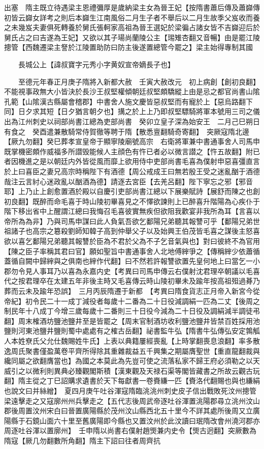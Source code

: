 出塞　隋主既立待遇梁主恩禮彌厚是歲納梁主女為晉王妃【按隋書蕭后傳及蕭巋傳初皆云巋女詳考之則后本巋生江南風俗二月生子者不舉后以二月生故季父岌收而養之未幾岌夫妻俱死轉養於舅氏張軻家高祖為晉王選妃於梁徧占諸女皆不吉巋迎后於舅氏占之曰吉遂為王妃】又欲以其子瑒尚蘭陵公主【㻛雉杏翻又音暢】由是罷江陵摠管【西魏遷梁主詧於江陵置助防曰防主後遂置總管今罷之】梁主始得專制其國

　　長城公上【諱叔寶字元秀小字黄奴宣帝嫡長子也】

　　至德元年春正月庚子隋將入新都大赦　壬寅大赦改元　初上病創【創初良翻】不能視事政無大小皆決於長沙王叔堅權傾朝廷叔堅頗驕縱上由是忌之都官尚書山隂孔範【山隂漢古縣屬會稽郡】中書舍人施文慶皆惡叔堅而有寵於上【惡烏路翻下同】日夕求其短【日夕猶言朝夕也】搆之於上上乃即叔堅驃騎將軍本號用三司之儀出為江州刺史以祠部尚書江總為吏部尚書　癸卯立皇子深為始安王　二月己巳朔日有食之　癸酉遣兼散騎常侍賀徹等聘于隋【散悉亶翻騎奇寄翻】　突厥寇隋北邊【厥九勿翻】癸巳葬孝宣皇帝于顯寧陵廟號高宗　右衛將軍兼中書通事舍人司馬申既掌機密頗作威福多所譛毁能候人主顔色有忤已者必以微言譛之【忤五故翻】附已者因機進之是以朝廷内外皆從風而靡上欲用侍中吏部尚書毛喜為僕射申惡喜彊直言於上曰喜臣之妻兄高宗時稱陛下有酒德【周公戒成王曰無若殷王受之迷亂酗于酒德哉注云言紂心迷政亂以酗酒為德】請逐去宮臣【去羌呂翻】陛下寧忘之邪【邪音耶】上乃止上創愈置酒於殿以自慶引吏部尚書江總以下展樂賦詩【展舒而陳之也創初良翻】既醉而命毛喜于時山陵初畢喜見之不懌欲諫則上已醉喜升階陽為心疾仆于階下移出省中上醒謂江總曰我悔召毛喜彼實無疾但欲阻我歡宴非我所為耳【言喜以帝所為為非】乃與司馬申謀曰此人負氣吾欲乞鄱陽兄弟聽其報讐可乎【鄱陽兄弟世祖諸子也高宗之簒殺劉師知韓子高到仲舉父子以及始興王伯茂皆毛喜之謀後主怒喜欲以喜乞鄱陽兄弟聽其報讐於臣為不君於父為不子乞音氣與也】對曰彼終不為官用【陳之臣子率稱其君曰官】願如聖旨中書通事舍人北地傅縡爭之【傳稱縡少依蕭循蓋循自闕中歸縡與之俱南也縡作代翻】曰不然若許報讐欲置先皇何地上曰當乞一小郡勿令見人事耳乃以喜為永嘉内史【考異曰司馬申傳云右僕射沈君理卒朝議以毛喜代之按君理卒在太建五年非後主時又毛喜傳云時山陵初畢未及踰年按高祖殂過朞乃葬而云未及踰年恐誤】　三月丙辰隋遷于新都　【考異曰隋食貨志正月帝入新宮今從帝紀】初令民二十一成丁減役者每歲十二番為二十日役減調絹一匹為二丈【後周之制民年十八成丁今增三歲每歲十二番則三十日役今減為二十日役及調絹減半調徒弔翻】周末榷酒坊鹽池鹽井至是皆罷之【周末官制酒坊收利鹽池鹽井皆禁百姓採用池鹽則河東池鹽井鹽則蜀中處處有之榷古岳翻】祕書監牛弘【隋書牛弘傳弘安定鶉觚人本姓尞氏父允仕魏賜姓牛氏】上表以典籍屢經喪亂【上時掌翻喪息浪翻】率多散逸周氏聚書僅盈萬卷平齊所得除其重雜裁益五千興集之期屬膺聖世【重直龍翻裁與纔同屬之欲翻膺當也】為國之本莫此為先豈可使之流落私家不歸王府必須勒之以天威引之以微利則異典必臻觀閣斯積【漢東觀及天禄石渠等閣皆藏書之所故云觀古玩翻】隋主從之丁巳詔購求遺書於天下每獻書一卷賚縑一匹【賚洛代翻賜也與也縑絹也說文曰并絲繒】　夏四月庚午吐谷渾寇隋臨洮洮州刺史皮子信出戰敗死汶州摠管梁遠擊走之又寇廓州州兵擊走之【五代志後周武帝逐吐谷渾置洮陽郡尋立洮州汶山郡後周置汶州宋白曰晉置廣陽縣於茂州汶山縣西北五十里今不詳其處所後周又立廣陽縣于石鏡山面六十里至舊廣陽即今縣也又置汶州於此汶讀曰珉隋改會州澆河郡亦周逐吐谷渾以置廓州】　壬申隋以尚書右僕射趙煚兼内史令【煚古迥翻】突厥數為隋寇【厥几勿翻數所角翻】隋主下詔曰往者周齊抗

